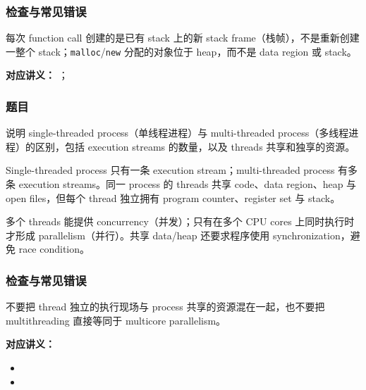 \subsubsection*{检查与常见错误}

每次 function call 创建的是已有 stack 上的新 stack frame（栈帧），不是重新创建一整个 stack；\texttt{malloc}/\texttt{new} 分配的对象位于 heap，而不是 data region 或 stack。


\textbf{对应讲义：}
；

\subsubsection*{题目}

说明 single-threaded process（单线程进程）与 multi-threaded process（多线程进程）的区别，包括 execution streams 的数量，以及 threads 共享和独享的资源。

\begin{checkedsolution}
Single-threaded process 只有一条 execution stream；multi-threaded process 有多条 execution streams。同一 process 的 threads 共享 code、data region、heap 与 open files，但每个 thread 独立拥有 program counter、register set 与 stack。

多个 threads 能提供 concurrency（并发）；只有在多个 CPU cores 上同时执行时才形成 parallelism（并行）。共享 data/heap 还要求程序使用 synchronization，避免 race condition。
\end{checkedsolution}

\subsubsection*{检查与常见错误}

不要把 thread 独立的执行现场与 process 共享的资源混在一起，也不要把 multithreading 直接等同于 multicore parallelism。

\clearpage
{}

\textbf{对应讲义：}
\begin{itemize}[leftmargin=2em]
  \item {}
  \item {}
\end{itemize}

